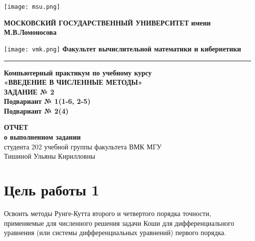 \documentclass[a4paper,12pt,titlepage,finall]{article}
\begin{document}
\begin{titlepage}
	\begin{center}
	\texttt{[image: msu.png]}
	\hfill
	\begin{minipage}[b]{0.77\textwidth}
		\centering
		\textbf{\fontsize{12}{9}\selectfont МОСКОВСКИЙ ГОСУДАРСТВЕННЫЙ УНИВЕРСИТЕТ}
		\bigbreak
		\textbf{\fontsize{12}{9}\selectfont имени М.В.Ломоносова}
	\end{minipage}
	\hfill
	\texttt{[image: vmk.png]}
	\bigbreak
	\textbf{\fontsize{12}{9}\selectfont Факультет вычислительной математики и кибернетики}
	\end{center}
	\vspace{-0.1cm}
	\hrule
	
	\vfill
	
	\begin{center}
	{\fontsize{16}{30}\selectfont 
	\bf Компьютерный практикум по учебному курсу\\ 
				«ВВЕДЕНИЕ В ЧИСЛЕННЫЕ МЕТОДЫ» \\ 
				ЗАДАНИЕ № 2 \\
				Подвариант № 1(1-6, 2-5)\\
				Подвариант № 2(4)\\}
				
	\vspace{20pt}
	
	{\fontsize{16}{30}\selectfont 
	\textbf{ОТЧЕТ\\
	о выполненном задании\\}
	студента 202 учебной группы факультета ВМК МГУ\\
	Тишиной Ульяны Кирилловны\\}
	\end{center}
	
	\vfill



\end{titlepage}

\tableofcontents
\newpage
\section{Цель работы 1}
Освоить методы Рунге-Кутта второго и четвертого порядка точности, применяемые для численного решения задачи Коши для дифференциального уравнения (или системы дифференциальных уравнений) первого порядка.
\end{document}
